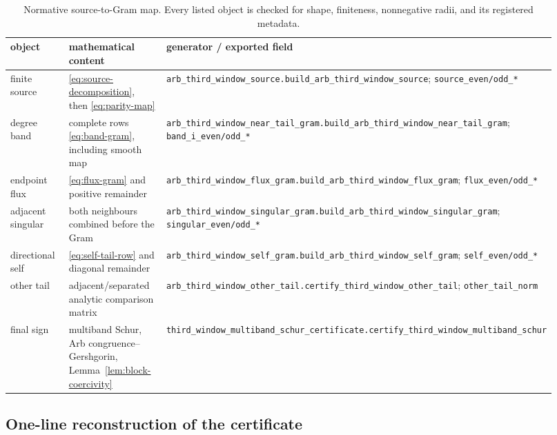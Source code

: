 \documentclass[10pt]{article}
\begin{document}
\begin{table}[H]\small
\centering
\caption{Normative source-to-Gram map.  Every listed object is checked for
shape, finiteness, nonnegative radii, and its registered metadata.}
\label{tab:source-gram-map}
\begin{tabular}{@{}>{\raggedright\arraybackslash}p{0.18\linewidth}
>{\raggedright\arraybackslash}p{0.28\linewidth}
>{\raggedright\arraybackslash}p{0.46\linewidth}@{}}
\toprule
object & mathematical content & generator / exported field\\
\midrule
finite source & \eqref{eq:source-decomposition}, then \eqref{eq:parity-map}
& \nolinkurl{arb_third_window_source.build_arb_third_window_source};
  \nolinkurl{source_even/odd_*}\\
degree band & complete rows \eqref{eq:band-gram}, including smooth map
& \nolinkurl{arb_third_window_near_tail_gram.build_arb_third_window_near_tail_gram};
  \nolinkurl{band_i_even/odd_*}\\
endpoint flux & \eqref{eq:flux-gram} and positive remainder
& \nolinkurl{arb_third_window_flux_gram.build_arb_third_window_flux_gram};
  \nolinkurl{flux_even/odd_*}\\
adjacent singular & both neighbours combined before the Gram
& \nolinkurl{arb_third_window_singular_gram.build_arb_third_window_singular_gram};
  \nolinkurl{singular_even/odd_*}\\
directional self & \eqref{eq:self-tail-row} and diagonal remainder
& \nolinkurl{arb_third_window_self_gram.build_arb_third_window_self_gram};
  \nolinkurl{self_even/odd_*}\\
other tail & adjacent/separated analytic comparison matrix
& \nolinkurl{arb_third_window_other_tail.certify_third_window_other_tail};
  \nolinkurl{other_tail_norm}\\
final sign & multiband Schur, Arb congruence--Gershgorin, Lemma~\ref{lem:block-coercivity}
& \nolinkurl{third_window_multiband_schur_certificate.certify_third_window_multiband_schur}\\
\bottomrule
\end{tabular}
\end{table}

\subsection{One-line reconstruction of the certificate}
\end{document}
